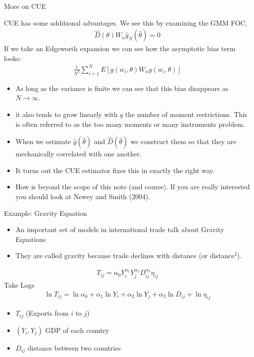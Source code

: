 \documentclass[aspectratio=169]{beamer}
\begin{document}
\begin{frame}{More on CUE}

CUE has some additional advantages. We see this by examining the GMM FOC. 
\begin{eqnarray*}
\hat{D}(\theta) W_n \hat{g}_N(\hat{\theta}) =0
\end{eqnarray*}
If we take an \alert{Edgeworth expansion} we can see how the  \alert{asymptotic bias} term looks:
\begin{eqnarray*}
\frac{1}{N^2}\sum_{i=1}^N E[g(w_i,\theta) W_n g(w_i,\theta)]
\end{eqnarray*}
\begin{itemize}
\item As long as the variance is finite we can see that this bias disappears as $N \rightarrow \infty$. 
\item  it also tends to grow linearly with $q$ the number of moment restrictions. This is often referred to as the \alert{too many moments} or \alert{many instruments} problem.
\item When we estimate $\hat{g}(\hat{\theta})$ and $\hat{D}(\hat{\theta})$ we construct them so that they are mechanically correlated with one another.
\item  It turns out the CUE estimator fixes this in exactly the right way. 
\item How is beyond the scope of this note (and course). If you are really interested you should look at Newey and Smith (2004).
\end{itemize}
\end{frame}

\begin{frame}{Example: Gravity Equation}
\begin{itemize}
\item An important set of models in international trade talk about \alert{Gravity Equations}
\item They are called gravity because trade declines with distance (or distance$^2$).
\end{itemize}
\begin{align*}
T_{ij}  = \alpha_0 Y_i^{\alpha_1} Y_j^{\alpha_2} D_{ij}^{\alpha_3} \eta_{ij}
\end{align*}
Take Logs
\begin{align*}
\ln T_{ij}  =  \ln \alpha_0  +\alpha_1 \ln Y_i + \alpha_2 \ln Y_j + \alpha_3 \ln D_{ij} + \ln \eta_{ij}
\end{align*}
\begin{itemize}
\item $T_{ij}$  (Exports from $i$ to $j$)
\item $(Y_i,Y_j)$ GDP of each country
\item $D_{ij}$ distance between two countries
\end{itemize}
\end{frame}
\end{document}
